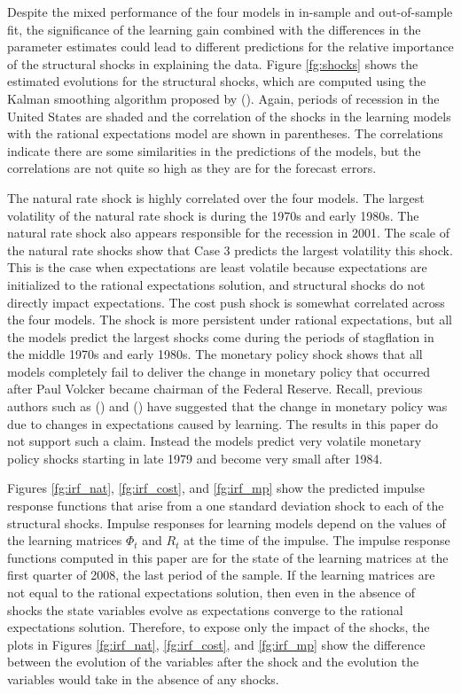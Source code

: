 \documentclass[11pt]{article}
\newcommand{\citee}[1]{\citeauthor*{#1} (\citeyear{#1})}
\begin{document}
Despite the mixed performance of the four models in in-sample and out-of-sample fit, the significance of the learning gain combined with the differences in the parameter estimates could lead to different predictions for the relative importance of the structural shocks in explaining the data.  Figure \ref{fg:shocks} shows the estimated evolutions for the structural shocks, which are computed using the Kalman smoothing algorithm proposed by \citee{jong1989}.  Again, periods of recession in the United States are shaded and the correlation of the shocks in the learning models with the rational expectations model are shown in parentheses.  The correlations indicate there are some similarities in the predictions of the models, but the correlations are not quite so high as they are for the forecast errors.  

The natural rate shock is highly correlated over the four models.  The largest volatility of the natural rate shock is during the 1970s and early 1980s.  The natural rate shock also appears responsible for the recession in 2001.  The scale of the natural rate shocks show that Case 3 predicts the largest volatility this shock.  This is the case when expectations are least volatile because expectations are initialized to the rational expectations solution, and structural shocks do not directly impact expectations.  The cost push shock is somewhat correlated across the four models.  The shock is more persistent under rational expectations, but all the models predict the largest shocks come during the periods of stagflation in the middle 1970s and early 1980s.  The monetary policy shock shows that all models completely fail to deliver the change in monetary policy that occurred after Paul Volcker became chairman of the Federal Reserve.  Recall, previous authors such as \citee{primiceri2006} and \citee{ow2005b} have suggested that the change in monetary policy was due to changes in expectations caused by learning.  The results in this paper do not support such a claim.  Instead the models predict very volatile monetary policy shocks starting in late 1979 and become very small after 1984.

Figures \ref{fg:irf_nat}, \ref{fg:irf_cost}, and \ref{fg:irf_mp} show the predicted impulse response functions that arise from a one standard deviation shock to each of the structural shocks.  Impulse responses for learning models depend on the values of the learning matrices $\Phi_t$ and $R_t$ at the time of the impulse.  The impulse response functions computed in this paper are for the state of the learning matrices at the first quarter of 2008, the last period of the sample.  If the learning matrices are not equal to the rational expectations solution, then even in the absence of shocks the state variables evolve as expectations converge to the rational expectations solution.  Therefore, to expose only the impact of the shocks, the plots in Figures \ref{fg:irf_nat}, \ref{fg:irf_cost}, and \ref{fg:irf_mp} show the difference between the evolution of the variables after the shock and the evolution the variables would take in the absence of any shocks.
\end{document}
